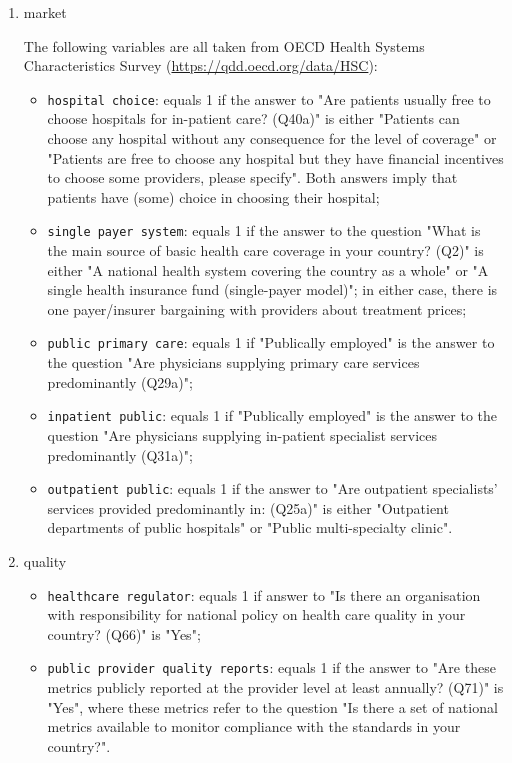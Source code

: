 \documentclass[12pt,english,a4paper]{article}
\begin{document}
\begin{enumerate}
\item market
\label{sec:org18fec0b}

The following variables are all taken from OECD Health Systems Characteristics Survey (\url{https://qdd.oecd.org/data/HSC}):
\begin{itemize}
\item \texttt{hospital choice}: equals 1 if the answer to "Are patients usually free to choose hospitals for in-patient care? (Q40a)" is either "Patients can choose any hospital without any consequence for the level of coverage" or "Patients are free to choose any hospital but they have financial incentives to choose some providers, please specify". Both answers imply that patients have (some) choice in choosing their hospital;
\item \texttt{single payer system}: equals 1 if the answer to the question "What is the main source of basic health care coverage in your country? (Q2)" is either "A national health system covering the country as a whole" or "A single health insurance fund (single-payer model)"; in either case, there is one payer/insurer bargaining with providers about treatment prices;
\item \texttt{public primary care}: equals 1 if "Publically employed" is the answer to the question "Are physicians supplying primary care services predominantly (Q29a)";
\item \texttt{inpatient public}: equals 1 if "Publically employed" is the answer to the question "Are physicians supplying in-patient specialist services predominantly (Q31a)";
\item \texttt{outpatient public}: equals 1 if the answer to "Are outpatient specialists' services provided predominantly in: (Q25a)" is either "Outpatient departments of public hospitals" or "Public multi-specialty clinic".
\end{itemize}


\item quality
\label{sec:org8863c78}

\begin{itemize}
\item \texttt{healthcare regulator}: equals 1 if answer to "Is there an organisation with responsibility for national policy on health care quality in your country? (Q66)" is "Yes";
\item \texttt{public provider quality reports}: equals 1 if the answer to "Are these metrics publicly reported at the provider level at least annually? (Q71)" is "Yes", where these metrics refer to the question "Is there a set of national metrics available to monitor compliance with the standards in your country?".
\end{itemize}
\end{enumerate}
\end{document}
